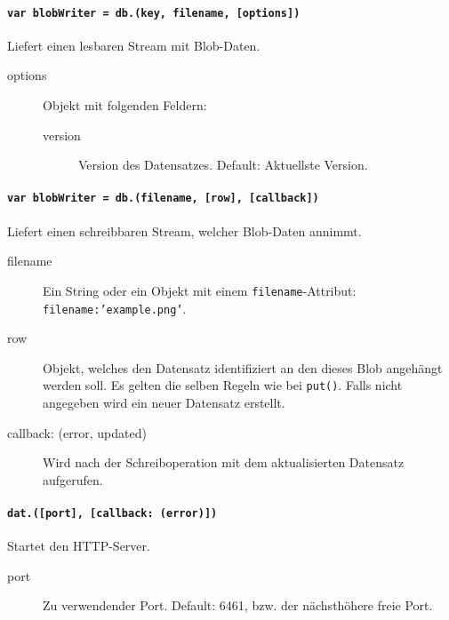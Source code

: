
\paragraph{\texttt{var blobWriter = db.(key, filename, [options])}}
Liefert einen lesbaren Stream mit Blob-Daten.

\begin{description}
\item[options] Objekt mit folgenden Feldern:
    \begin{description}
    \item[version] Version des Datensatzes. Default: Aktuellste Version.
    \end{description}
\end{description}


\paragraph{\texttt{var blobWriter = db.(filename, [row], [callback])}}
Liefert einen schreibbaren Stream, welcher Blob-Daten annimmt.

\begin{description}
\item[filename] Ein String oder ein Objekt mit einem \texttt{filename}-Attribut: \texttt{{filename:'example.png'}}.
\item[row] Objekt, welches den Datensatz identifiziert an den dieses Blob angehängt werden soll. Es gelten die selben Regeln wie bei \texttt{put()}. Falls nicht angegeben wird ein neuer Datensatz erstellt.
\item[callback: (error, updated)] Wird nach der Schreiboperation mit dem aktualisierten Datensatz aufgerufen.
\end{description}


\paragraph{\texttt{dat.([port], [callback: (error)])}}
Startet den HTTP-Server.

\begin{description}
\item[port] Zu verwendender Port. Default: 6461, bzw. der nächsthöhere freie Port.
\end{description}

